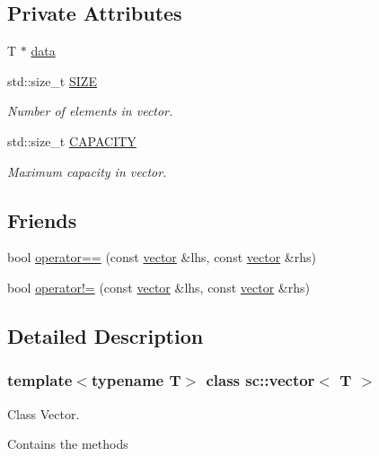 \subsection*{Private Attributes}
\begin{DoxyCompactItemize}
\item 
T $\ast$ \hyperlink{classsc_1_1vector_ab0607397430a55a5a484dfea79867467}{data}
\item 
std\+::size\+\_\+t \hyperlink{classsc_1_1vector_ad6729b20ad502c5fdf480fec848476f6}{S\+I\+ZE}
\begin{DoxyCompactList}\small\item\em Number of elements in vector. \end{DoxyCompactList}\item 
std\+::size\+\_\+t \hyperlink{classsc_1_1vector_ae4c67859be8cfdd445d2700d55125184}{C\+A\+P\+A\+C\+I\+TY}
\begin{DoxyCompactList}\small\item\em Maximum capacity in vector. \end{DoxyCompactList}\end{DoxyCompactItemize}
\subsection*{Friends}
\begin{DoxyCompactItemize}
\item 
bool \hyperlink{classsc_1_1vector_a33679563540934e4c3e487aa12a63424}{operator==} (const \hyperlink{classsc_1_1vector}{vector} \&lhs, const \hyperlink{classsc_1_1vector}{vector} \&rhs)
\item 
bool \hyperlink{classsc_1_1vector_a2c27118e557a04c2dc8d062e1afe730a}{operator!=} (const \hyperlink{classsc_1_1vector}{vector} \&lhs, const \hyperlink{classsc_1_1vector}{vector} \&rhs)
\end{DoxyCompactItemize}


\subsection{Detailed Description}
\subsubsection*{template$<$typename T$>$\newline
class sc\+::vector$<$ T $>$}

Class Vector. 

Contains the methods 

